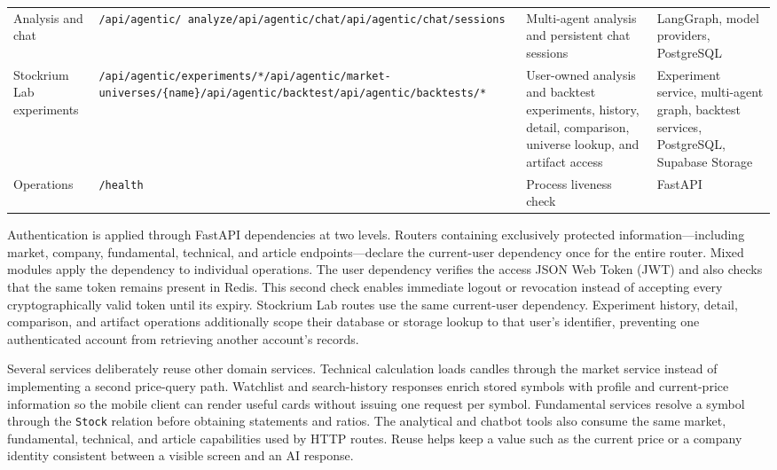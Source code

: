 {\begin{longtable}{>{\raggedright\arraybackslash}p{2.25cm} >{\raggedright\arraybackslash}p{3.35cm} >{\raggedright\arraybackslash}p{5.05cm} >{\raggedright\arraybackslash}p{2.45cm}}
    Analysis and chat & \texttt{/api/agentic/ analyze}\newline \texttt{/api/agentic/chat}\newline \texttt{/api/agentic/chat/}\newline \texttt{sessions} & Multi-agent analysis and persistent chat sessions & LangGraph, model providers, PostgreSQL \\
    Stockrium Lab experiments & \texttt{/api/agentic/experiments/*}\newline \texttt{/api/agentic/market- universes/\{name\}}\newline \texttt{/api/agentic/backtest}\newline \texttt{/api/agentic/backtests/*} & User-owned analysis and backtest experiments, history, detail, comparison, universe lookup, and artifact access & Experiment service, multi-agent graph, backtest services, PostgreSQL, Supabase Storage \\
    Operations & \texttt{/health} & Process liveness check & FastAPI \\
\end{longtable}
}

\FloatBarrier

Authentication is applied through FastAPI dependencies at two levels. Routers containing exclusively protected information---including market, company, fundamental, technical, and article endpoints---declare the current-user dependency once for the entire router. Mixed modules apply the dependency to individual operations. The user dependency verifies the access JSON Web Token (JWT) and also checks that the same token remains present in Redis. This second check enables immediate logout or revocation instead of accepting every cryptographically valid token until its expiry. Stockrium Lab routes use the same current-user dependency. Experiment history, detail, comparison, and artifact operations additionally scope their database or storage lookup to that user's identifier, preventing one authenticated account from retrieving another account's records.

Several services deliberately reuse other domain services. Technical calculation loads candles through the market service instead of implementing a second price-query path. Watchlist and search-history responses enrich stored symbols with profile and current-price information so the mobile client can render useful cards without issuing one request per symbol. Fundamental services resolve a symbol through the \texttt{Stock} relation before obtaining statements and ratios. The analytical and chatbot tools also consume the same market, fundamental, technical, and article capabilities used by HTTP routes. Reuse helps keep a value such as the current price or a company identity consistent between a visible screen and an AI response.

